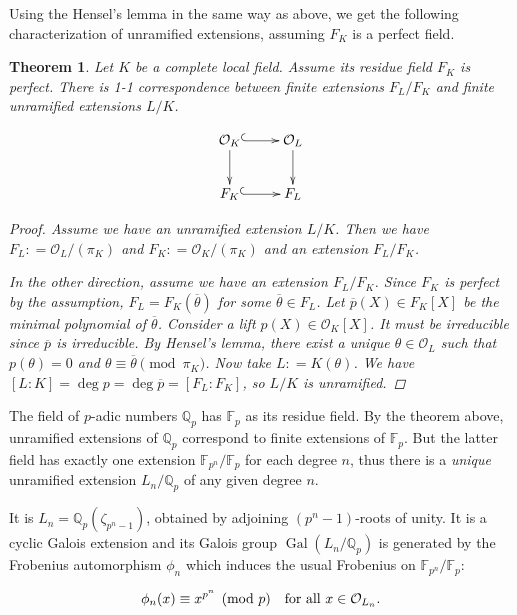 \documentclass{article}
\newcommand{\dfn}{\mathrel{\mathop:}=}
\newcommand{\FF}{\mathbb{F}}
\newcommand{\QQ}{\mathbb{Q}}
\DeclareMathOperator{\Gal}{Gal}
\newcommand{\examplesymbol}{$\blacktriangle$}
\renewcommand{\qedsymbol}{$\blacksquare$}
\theoremstyle{myplain}
\newtheorem{theorem}[proposition]{Theorem}
\theoremstyle{mydefinition}
\newenvironment{example}
  {\pushQED{\qed}\renewcommand{\qedsymbol}{\examplesymbol}\examplex}
  {\popQED\endexamplex}
\begin{document}
Using the Hensel's lemma in the same way as above, we get the following
characterization of unramified extensions, assuming $F_K$ is a perfect field.

\begin{theorem}
  Let $K$ be a complete local field. Assume its residue field $F_K$ is
  perfect. There is 1-1 correspondence between finite extensions $F_L/F_K$ and
  finite unramified extensions $L/K$.

  \[ \xymatrix{
      \mathcal{O}_K\ar@{^(->}[r]\ar[d] & \mathcal{O}_L\ar[d] \\
      F_K\ar@{^(->}[r] & F_L
    } \]

  \begin{proof}
    Assume we have an unramified extension $L / K$. Then we have
    $F_L \dfn \mathcal{O}_L / (\pi_K)$ and $F_K \dfn \mathcal{O}_K / (\pi_K)$ and an extension
    $F_L / F_K$.

    \vspace{1em}

    In the other direction, assume we have an extension $F_L/F_K$. Since $F_K$
    is perfect by the assumption, $F_L = F_K (\overline{\theta})$ for some
    $\overline{\theta} \in F_L$. Let $\overline{p} (X) \in F_K [X]$ be the
    minimal polynomial of $\overline{\theta}$. Consider a lift
    $p (X) \in \mathcal{O}_K [X]$. It must be irreducible since $\overline{p}$ is
    irreducible. By Hensel's lemma, there exist a \emph{unique}
    $\theta \in \mathcal{O}_L$ such that $p (\theta) = 0$ and
    $\theta \equiv \overline{\theta} \pmod{\pi_K}$. Now take
    $L \dfn K (\theta)$. We have
    $[L : K] = \deg p = \deg \overline{p} = [F_L : F_K]$, so $L/K$ is
    unramified.
  \end{proof}
\end{theorem}

\begin{example}\label{example:unramified-extensions-of-Qp}
  The field of $p$-adic numbers $\QQ_p$ has $\FF_p$ as its residue field. By the
  theorem above, unramified extensions of $\QQ_p$ correspond to finite
  extensions of $\FF_p$. But the latter field has exactly one extension
  $\FF_{p^n} / \FF_p$ for each degree $n$, thus there is a \emph{unique}
  unramified extension $L_n/\QQ_p$ of any given degree $n$.

  It is $L_n = \QQ_p (\zeta_{p^n-1})$, obtained by adjoining $(p^n - 1)$-roots
  of unity. It is a cyclic Galois extension and its Galois group
  $\Gal (L_n / \QQ_p)$ is generated by the Frobenius automorphism $\phi_n$ which
  induces the usual Frobenius on $\FF_{p^n} / \FF_p$:

  \[ \phi_n (x) \equiv x^{p^n} \pmod{p} \quad \text{for all }x \in \mathcal{O}_{L_n}. \qedhere \]
\end{example}
\end{document}
